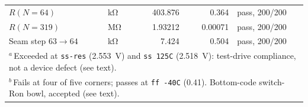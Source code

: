 \begin{table}[htbp]
\begin{tabular}{llrrl}
    $R(N{=}64)$ & \si{\kilo\ohm} & 403.876 & 0.364 & pass, 200/200 \\
    $R(N{=}319)$ & \si{\mega\ohm} & 1.93212 & 0.00071 & pass, 200/200 \\
    Seam step $63{\to}64$ & \si{\kilo\ohm} & 7.424 & 0.504 & pass, 200/200 \\
    \bottomrule
    \multicolumn{5}{l}{\footnotesize $^{a}$\,Exceeded at \texttt{ss-res}
      (\SI{2.553}{\volt}) and \texttt{ss 125C} (\SI{2.518}{\volt}): test-drive
      compliance, not a device defect (see text).} \\
    \multicolumn{5}{l}{\footnotesize $^{b}$\,Fails at four of five corners;
      passes at \texttt{ff -40C} (0.41). Bottom-code switch-Ron bowl, accepted
      (see text).} \\
  \end{tabular}
\end{table}

%
%
%

